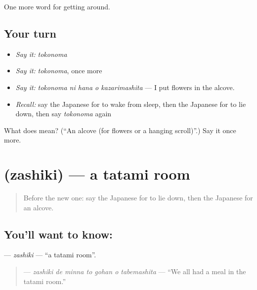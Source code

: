 \begin{grammarlens}[title={What you've built}]
One more word for getting around.
\end{grammarlens}

\subsection*{Your turn}
\begin{itemize}
\raggedright
  \item \emph{Say it:} \emph{tokonoma}
  \item \emph{Say it:} \emph{tokonoma}, once more
  \item \emph{Say it:} \emph{tokonoma ni hana o kazarimashita} — I put flowers in the alcove.
  \item \emph{Recall:} say the Japanese for to wake from sleep, then the Japanese for to lie down, then say \emph{tokonoma} again
\end{itemize}

\begin{tcolorbox}[breakable,colback=teal!4,colframe=teal!35!black,title={Before you move on}]
What does  mean? (\textquotedblleft{}An alcove (for flowers or a hanging scroll)\textquotedblright{}.) Say it once more.
\end{tcolorbox}
\section[\texorpdfstring{\ja{ざしき} (zashiki)}{ざしき (zashiki)}]{ (zashiki) — a tatami room}

\label{lesson:JA-C400-zashiki}



\begin{quote}
Before the new one: say the Japanese for to lie down, then the Japanese for an alcove.
\end{quote}

\subsection*{You'll want to know: }
\textbf{} — \emph{zashiki} — \textquotedblleft{}a tatami room\textquotedblright{}.

\begin{quote}
\textbf{   } — \emph{zashiki de minna to gohan o tabemashita} — \textquotedblleft{}We all had a meal in the tatami room.\textquotedblright{}
\end{quote}

